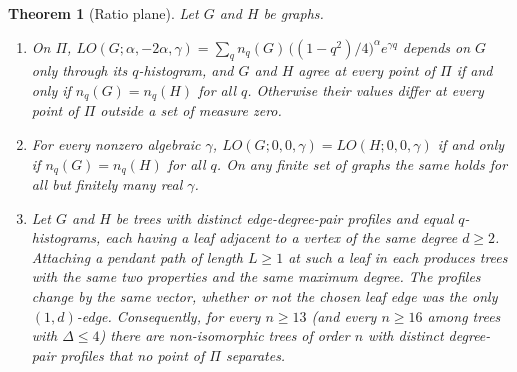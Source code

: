 \documentclass[a5paper, 10pt]{article}
\theoremstyle{plain}
\newtheorem{theorem}{Theorem}
\theoremstyle{remark}
\theoremstyle{definition}
\begin{document}
  \begin{theorem}[Ratio plane]\label{thm:ratioplane}
  Let $G$ and $H$ be graphs.
  \begin{enumerate}
  \item[(i)] On $\Pi$,
  $LO(G;\alpha,-2\alpha,\gamma) = \sum_q n_q(G)\,\bigl((1-q^2)/4\bigr)^{\alpha}
  e^{\gamma q}$ depends on $G$ only through its $q$-histogram, and $G$ and
  $H$ agree at every point of $\Pi$ if and only if $n_q(G) = n_q(H)$
  for all $q$. Otherwise their values differ at every point of $\Pi$
  outside a set of measure zero.
  \item[(ii)] For every nonzero algebraic $\gamma$,
  $LO(G;0,0,\gamma) = LO(H;0,0,\gamma)$ if and only if
  $n_q(G) = n_q(H)$ for all $q$. On any finite set of graphs the same
  holds for all but finitely many real $\gamma$.
  \item[(iii)] Let $G$ and $H$ be trees with distinct
  edge-degree-pair profiles and equal $q$-histograms, each having a
  leaf adjacent to a vertex of the same degree $d \ge 2$. Attaching a pendant path of length $L \ge 1$ at such a leaf in each
  produces trees with the same two properties and the same maximum
  degree. The profiles change by the same vector, whether or not the
  chosen leaf edge was the only $(1,d)$-edge.
  Consequently, for every $n \ge 13$ (and every $n \ge 16$ among trees
  with $\Delta \le 4$) there are non-isomorphic trees of order $n$
  with distinct degree-pair profiles that no point of $\Pi$ separates.
  \end{enumerate}
  \end{theorem}
\end{document}

